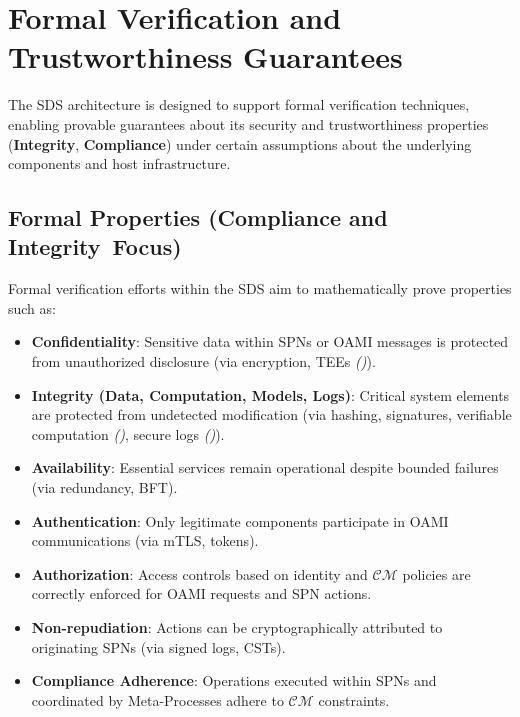 \documentclass[12pt,a4paper]{report}
\renewcommand{\citep}[1]{\textit{\scriptsize{(\cite{#1})}}}
\newcommand{\Integrity}{\textbf{Integrity}}
\begin{document}
	\section{Formal Verification and Trustworthiness Guarantees} %
	\label{sec:4-4} %
	
	The SDS architecture is designed to support formal verification techniques, enabling provable guarantees about its security and trustworthiness properties (\Integrity, \textbf{Compliance}) under certain assumptions about the underlying components and host infrastructure.
	
	\subsection{Formal Properties (\textbf{Compliance} and \Integrity\ Focus)} %
	\label{sec:4-4-1} %
	
	Formal verification efforts within the SDS aim to mathematically prove properties such as:
	\begin{itemize}[noitemsep]
		\item \textbf{Confidentiality}: Sensitive data within SPNs or OAMI messages is protected from unauthorized disclosure (via encryption, TEEs \citep{Citadel_PlusPlus_2025}).
		\item \textbf{Integrity (Data, Computation, Models, Logs)}: Critical system elements are protected from undetected modification (via hashing, signatures, verifiable computation \citep{Peng2025ZKMLSurvey}, secure logs \citep{ProML_Provenance_2022}).
		\item \textbf{Availability}: Essential services remain operational despite bounded failures (via redundancy, BFT).
		\item \textbf{Authentication}: Only legitimate components participate in OAMI communications (via mTLS, tokens).
		\item \textbf{Authorization}: Access controls based on identity and $\mathcal{CM}$ policies are correctly enforced for OAMI requests and SPN actions.
		\item \textbf{Non-repudiation}: Actions can be cryptographically attributed to originating SPNs (via signed logs, CSTs).
		\item \textbf{Compliance Adherence}: Operations executed within SPNs and coordinated by Meta-Processes adhere to $\mathcal{CM}$ constraints.
	\end{itemize}
	
\end{document}
